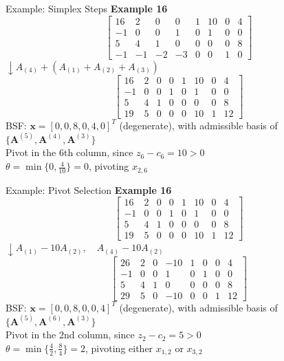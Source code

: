 \documentclass[aspectratio=169,hyperref,UTF8,CJK]{beamer}
\begin{document}
\begin{frame}{Example: Simplex Steps}
\textbf{Example 16}
\[
\begin{bmatrix}
16 & 2 & 0 & 0 & 1 & 10 & 0 & 4 \\
-1 & 0 & 0 & 1 & 0 & 1 & 0 & 0 \\
5 & 4 & 1 & 0 & 0 & 0 & 0 & 8 \\
-1 & -1 & -2 & -3 & 0 & 0 & 1 & 0
\end{bmatrix}
\]
\(\downarrow A_{(4)} + (A_{(1)} + A_{(2)} + A_{(3)})\)
\[
\begin{bmatrix}
16 & 2 & 0 & 0 & 1 & 10 & 0 & 4 \\
-1 & 0 & 0 & 1 & 0 & 1 & 0 & 0 \\
5 & 4 & 1 & 0 & 0 & 0 & 0 & 8 \\
19 & 5 & 0 & 0 & 0 & 10 & 1 & 12
\end{bmatrix}
\]
BSF: \(\mathbf{x} = [0, 0, 8, 0, 4, 0]^T\) (degenerate), with admissible basis of \(\{\mathbf{A}^{(5)}, \mathbf{A}^{(4)}, \mathbf{A}^{(3)}\}\) \\
Pivot in the 6th column, since \(z_6 - c_6 = 10 > 0\) \\
\(\theta = \min \{0, \frac{4}{10}\} = 0\), pivoting \(x_{2,6}\)
\end{frame}

\begin{frame}{Example: Pivot Selection}
\textbf{Example 16}
\[
\begin{bmatrix}
16 & 2 & 0 & 0 & 1 & 10 & 0 & 4 \\
-1 & 0 & 0 & 1 & 0 & 1 & 0 & 0 \\
5 & 4 & 1 & 0 & 0 & 0 & 0 & 8 \\
19 & 5 & 0 & 0 & 0 & 10 & 1 & 12
\end{bmatrix}
\]
\(\downarrow A_{(1)} - 10A_{(2)}, \quad A_{(4)} - 10A_{(2)}\)
\[
\begin{bmatrix}
26 & 2 & 0 & -10 & 1 & 0 & 0 & 4 \\
-1 & 0 & 0 & 1 & 0 & 1 & 0 & 0 \\
5 & 4 & 1 & 0 & 0 & 0 & 0 & 8 \\
29 & 5 & 0 & -10 & 0 & 0 & 1 & 12
\end{bmatrix}
\]
BSF: \(\mathbf{x} = [0, 0, 8, 0, 0, 4]^T\) (degenerate), with admissible basis of \(\{\mathbf{A}^{(5)}, \mathbf{A}^{(6)}, \mathbf{A}^{(3)}\}\) \\
Pivot in the 2nd column, since \(z_2 - c_2 = 5 > 0\) \\
\(\theta = \min\{\frac{4}{2}, \frac{8}{4}\} = 2\), pivoting either \(x_{1,2}\) or \(x_{3,2}\)
\end{frame}
\end{document}
